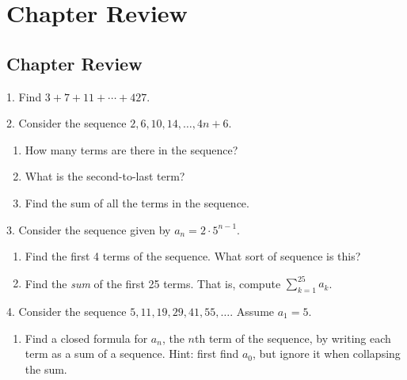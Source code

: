 \documentclass[10pt,]{book}
\theoremstyle{plain}
\theoremstyle{definition}
\numberwithin{equation}{chapter}
\def\d{\displaystyle}
\begin{document}
\section[Chapter Review]{Chapter Review}\label{section-17}
\typeout{************************************************}
\typeout{************************************************}
\subsection[Chapter Review]{Chapter Review}\label{sec_sequences-conc}
\begin{exerciselist}
\item[1.]\hypertarget{exercise-209}{}
            Find \(3 + 7 + 11+ \cdots + 427\).
\par\smallskip
\item[2.]\hypertarget{exercise-210}{}
            Consider the sequence \(2, 6, 10, 14, \ldots, 4n + 6\).
\leavevmode%
\begin{enumerate}[label=(\alph*)]
\item\hypertarget{li-589}{}
                How many terms are there in the sequence?
\item\hypertarget{li-590}{}
                What is the second-to-last term?
\item\hypertarget{li-591}{}
                Find the sum of all the terms in the sequence.
\end{enumerate}
\par\smallskip
\item[3.]\hypertarget{exercise-211}{}
            Consider the sequence given by \(a_n = 2\cdot 5^{n-1}\).
\leavevmode%
\begin{enumerate}[label=(\alph*)]
\item\hypertarget{li-595}{}
                Find the first 4 terms of the sequence. What sort of sequence is this?
\item\hypertarget{li-596}{}
                Find the \emph{sum} of the first 25 terms. That is, compute \(\d\sum_{k=1}^{25}a_k\).
\end{enumerate}
\par\smallskip
\item[4.]\hypertarget{exercise-212}{}
            Consider the sequence \(5, 11, 19, 29, 41, 55,\ldots\). Assume \(a_1 = 5\).
\leavevmode%
\begin{enumerate}[label=(\alph*)]
\item\hypertarget{li-599}{}
                Find a closed formula for \(a_n\), the \(n\)th term of the sequence, by writing each term as a sum of a sequence. Hint: first find \(a_0\), but ignore it when collapsing the sum.



\end{enumerate}
\end{exerciselist}
\end{document}
